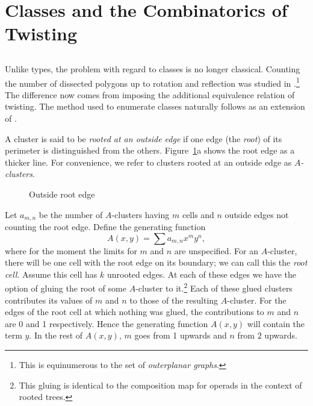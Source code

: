 \documentclass[10pt]{amsart}
\begin{document}
\section {Classes and the Combinatorics of Twisting}

\subsection{} \label{ss:aclusters}
Unlike types, the problem with regard to classes is no longer classical. Counting the number of dissected polygons up to rotation and reflection was studied in \cite{r1}.\footnote{This is equinumerous to the set of {\em outerplanar graphs}.}   The difference now comes from imposing the additional equivalence relation of twisting.  The method used to enumerate classes naturally follows as an extension of \cite{r1}.   

\begin{defn}
A cluster is said to be {\em rooted at an outside edge} if one edge (the {\em root}) of its perimeter is distinguished from the others.  Figure~\ref{rootedge}a shows the root edge as a thicker line. For convenience, we refer to clusters rooted at an outside edge as {\em $A$-clusters}.
\end{defn}

\begin{figure}[h]
\caption{Outside root edge}
\label{rootedge}
\end{figure}

Let $a_{m,n}$ be the number of $A$-clusters having $m$ cells and $n$ outside edges not counting the root edge.   Define the generating function
\begin{equation}
A(x, y)  =  \sum a_{m,n}x^m y^n,
\label{e:gena}
\end{equation}
where for the moment the limits for $m$ and $n$ are unspecified. For an $A$-cluster, there will be one cell with the root edge on its boundary;  we can call this the {\em root cell}.  Assume this cell has $k$ unrooted edges.  At each of these edges we have the option of gluing the root of some $A$-cluster to it.\footnote{This gluing is identical to the composition map for operads in the context of rooted trees.} Each of these glued clusters contributes its values of $m$ and $n$ to those of the resulting $A$-cluster.  For the edges of the root cell at which nothing was glued, the contributions to $m$ and $n$ are 0 and 1 respectively. Hence the generating function $A(x,y)$ will contain the term $y$.  In the rest of $A(x,y)$, $m$ goes from 1 upwards and $n$ from $2$ upwards.
\end{document}
